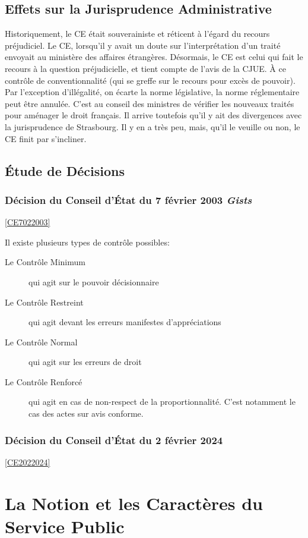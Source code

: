 \documentclass[math]{cours}
\begin{document}
\subsection{Effets sur la Jurisprudence Administrative}
Historiquement, le CE était souverainiste et réticent à l'égard du recours préjudiciel.
Le CE, lorsqu'il y avait un doute sur l'interprétation d'un traité envoyait au ministère des affaires étrangères.
Désormais, le CE est celui qui fait le recours à la question préjudicielle, et tient compte de l'avis de la CJUE.
À ce contrôle de conventionnalité (qui se greffe sur le recours pour excès de pouvoir).
Par l'exception d'illégalité, on écarte la norme législative, la norme réglementaire peut être annulée.
C'est au conseil des ministres de vérifier les nouveaux traités pour aménager le droit français.
Il arrive toutefois qu'il y ait des divergences avec la jurisprudence de Strasbourg.
Il y en a très peu, mais, qu'il le veuille ou non, le CE finit par s'incliner.

\subsection{Étude de Décisions}
\subsubsection{Décision du Conseil d'État du 7 février 2003 \textit{Gists}}
\ref{CE7022003}

Il existe plusieurs types de contrôle possibles:
\begin{description}
	\item[Le Contrôle Minimum] qui agit sur le pouvoir décisionnaire
	\item[Le Contrôle Restreint] qui agit devant les erreurs manifestes d'appréciations
	\item[Le Contrôle Normal] qui agit sur les erreurs de droit
	\item[Le Contrôle Renforcé] qui agit en cas de non-respect de la proportionnalité. C'est notamment le cas des actes sur avis conforme.
\end{description}

\subsubsection{Décision du Conseil d'État du 2 février 2024}
\ref{CE2022024}


\section{La Notion et les Caractères du Service Public}
\end{document}
